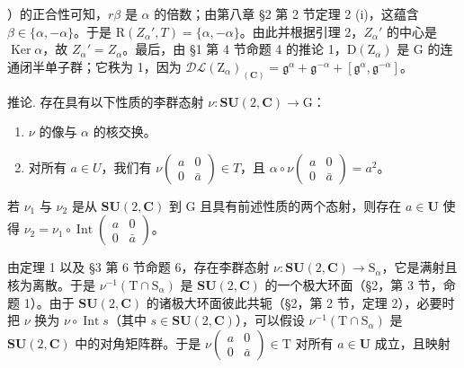 ）的正合性可知，\(r\beta\) 是 \(\alpha\) 的倍数；由第八章 §2 第 2 节定理 2 (i)，这蕴含 \(\beta \in \{\alpha, -\alpha\}\)。于是 \(\mathrm{R}(Z_{\alpha}', T) = \{\alpha, -\alpha\}\)。由此并根据引理 2，\(Z_{\alpha}'\) 的中心是 \(\operatorname{Ker} \alpha\)，故 \(Z_{\alpha}' = Z_{\alpha}\)。最后，由 §1 第 4 节命题 4 的推论 1，\(\mathrm{D}(\mathrm{Z}_{\alpha})\) 是 \(\mathrm{G}\) 的连通闭半单子群；它秩为 1，因为 \(\mathcal{DL}(\mathrm{Z}_{\alpha})_{(\mathbf{C})} = \mathfrak{g}^{\alpha} + \mathfrak{g}^{-\alpha} + [\mathfrak{g}^{\alpha},\mathfrak{g}^{-\alpha}]\)。

推论. 存在具有以下性质的李群态射 \(\nu : \mathbf{SU}(2, \mathbf{C}) \to \mathrm{G}\)：

\begin{enumerate}
\def\labelenumi{\alph{enumi})}
\item
  \(\nu\) 的像与 \(\alpha\) 的核交换。
\item
  对所有 \(a \in U\)，我们有 \(\nu\left(\begin{array}{cc}a & 0 \\ 0 & \bar{a}\end{array}\right) \in T\)，且 \(\alpha \circ \nu\left(\begin{array}{cc}a & 0 \\ 0 & \bar{a}\end{array}\right) = a^{2}\)。
\end{enumerate}

若 \(\nu_{1}\) 与 \(\nu_{2}\) 是从 \(\mathbf{SU}(2,\mathbf{C})\) 到 \(\mathrm{G}\) 且具有前述性质的两个态射，则存在 \(a\in \mathbf{U}\) 使得 \(\nu_{2} = \nu_{1}\circ \operatorname {Int}\left( \begin{array}{cc}a & 0\\ 0 & \bar{a} \end{array} \right)\)。

由定理 1 以及 §3 第 6 节命题 6，存在李群态射 \(\nu : \mathbf{SU}(2, \mathbf{C}) \to \mathrm{S}_{\alpha}\)，它是满射且核为离散。于是 \(\nu^{-1}(\mathrm{T} \cap \mathrm{S}_{\alpha})\) 是 \(\mathbf{SU}(2, \mathbf{C})\) 的一个极大环面（§2，第 3 节，命题 1）。由于 \(\mathbf{SU}(2, \mathbf{C})\) 的诸极大环面彼此共轭（§2，第 2 节，定理 2），必要时把 \(\nu\) 换为 \(\nu \circ \operatorname{Int}s\)（其中 \(s \in \mathbf{SU}(2, \mathbf{C})\)），可以假设 \(\nu^{-1}(\mathrm{T} \cap \mathrm{S}_{\alpha})\) 是 \(\mathbf{SU}(2, \mathbf{C})\) 中的对角矩阵群。于是 \(\nu\begin{pmatrix} a & 0 \\ 0 & \bar{a} \end{pmatrix} \in \mathrm{T}\) 对所有 \(a \in \mathbf{U}\) 成立，且映射


